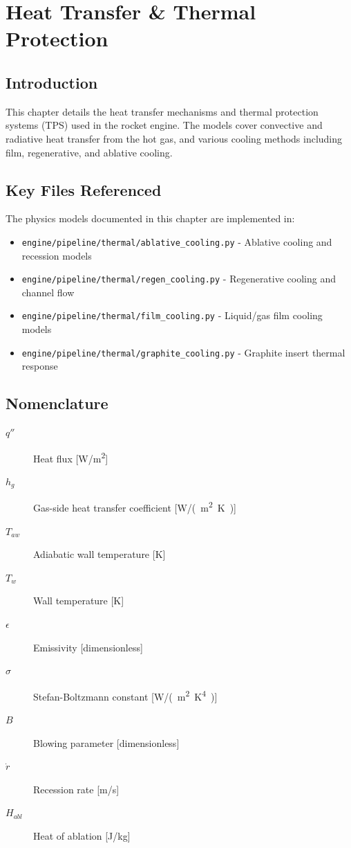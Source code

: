 \section{Heat Transfer \& Thermal Protection}

\subsection{Introduction}
This chapter details the heat transfer mechanisms and thermal protection systems (TPS) used in the rocket engine. The models cover convective and radiative heat transfer from the hot gas, and various cooling methods including film, regenerative, and ablative cooling.

\subsection{Key Files Referenced}
The physics models documented in this chapter are implemented in:
\begin{itemize}
    \item \texttt{engine/pipeline/thermal/ablative_cooling.py} - Ablative cooling and recession models
    \item \texttt{engine/pipeline/thermal/regen_cooling.py} - Regenerative cooling and channel flow
    \item \texttt{engine/pipeline/thermal/film_cooling.py} - Liquid/gas film cooling models
    \item \texttt{engine/pipeline/thermal/graphite_cooling.py} - Graphite insert thermal response
\end{itemize}

\subsection{Nomenclature}
\begin{description}
    \item[$q''$] Heat flux [\si{W/m^2}]
    \item[$h_g$] Gas-side heat transfer coefficient [\si{W/(m^2.K)}]
    \item[$T_{aw}$] Adiabatic wall temperature [\si{K}]
    \item[$T_w$] Wall temperature [\si{K}]
    \item[$\epsilon$] Emissivity [dimensionless]
    \item[$\sigma$] Stefan-Boltzmann constant [\si{W/(m^2.K^4)}]
    \item[$B$] Blowing parameter [dimensionless]
    \item[$\dot{r}$] Recession rate [\si{m/s}]
    \item[$H_{abl}$] Heat of ablation [\si{J/kg}]
\end{description}


